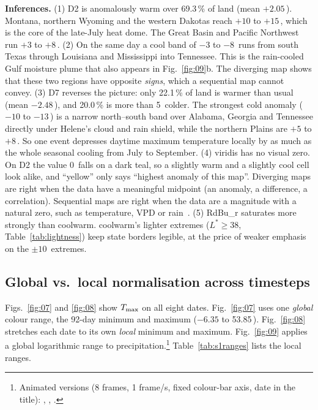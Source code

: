 \textbf{Inferences.}
(1) D2 is anomalously warm over 69.3\,\% of land (mean $+2.05$\,\degC). Montana, northern Wyoming and the western
Dakotas reach $+10$ to $+15$\,\degC, which is the core of the late-July heat dome. The Great Basin and Pacific Northwest
run $+3$ to $+8$\,\degC.
(2) On the same day a cool band of $-3$ to $-8$\,\degC{} runs from south Texas through Louisiana and Mississippi into
Tennessee. This is the rain-cooled Gulf moisture plume that also appears in Fig.~\ref{fig:09}b. The diverging map shows that
these two regions have opposite \emph{signs}, which a sequential map cannot convey.
(3) D7 reverses the picture: only 22.1\,\% of land is warmer than usual (mean $-2.48$\,\degC), and 20.0\,\% is more than
5\,\degC{} colder. The strongest cold anomaly ($-10$ to $-13$\,\degC) is a narrow north--south band over Alabama, Georgia
and Tennessee directly under Helene's cloud and rain shield, while the northern Plains are $+5$ to $+8$\,\degC. So one
event depresses daytime maximum temperature locally by as much as the whole seasonal cooling from July to September.
(4) viridis has no visual zero. On D2 the value 0\,\degC{} falls on a dark teal, so a slightly warm and a slightly cool cell
look alike, and ``yellow'' only says ``highest anomaly of this map''. Diverging maps are right when the data have a
meaningful midpoint (an anomaly, a difference, a correlation). Sequential maps are right when the data are a magnitude
with a natural zero, such as temperature, VPD or rain~\cite{moreland2009}.
(5) RdBu\_r saturates more strongly than coolwarm. coolwarm's lighter extremes ($L^*\geq38$, Table~\ref{tab:lightness})
keep state borders legible, at the price of weaker emphasis on the $\pm10$\,\degC{} extremes.

\subsection{Global vs.\ local normalisation across timesteps}
Figs.~\ref{fig:07} and \ref{fig:08} show $T_{\max}$ on all eight dates. Fig.~\ref{fig:07} uses one \emph{global} colour range,
the 92-day minimum and maximum ($-6.35$ to 53.85\,\degC). Fig.~\ref{fig:08} stretches each date to its own
\emph{local} minimum and maximum. Fig.~\ref{fig:09} applies a global logarithmic range to precipitation.\footnote{Animated
versions (8 frames, 1 frame/s, fixed colour-bar axis, date in the title):
, ,
.} Table~\ref{tab:s1ranges} lists the local ranges.

